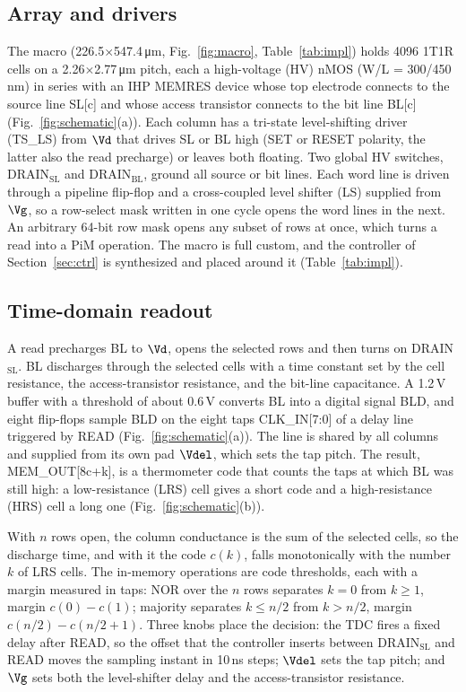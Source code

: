 \subsection{Array and drivers}
The macro (226.5$\times$547.4\,\si{\micro\meter}, Fig.~\ref{fig:macro}, Table~\ref{tab:impl}) holds 4096 1T1R cells on a 2.26$\times$2.77\,\si{\micro\meter} pitch, each a high-voltage (HV)
nMOS (W/L = 300/450\,nm) in series with an IHP MEMRES device whose top electrode connects to the
source line SL[c] and whose access transistor connects to the bit line BL[c]
(Fig.~\ref{fig:schematic}(a)). Each column has a tri-state level-shifting driver (TS\_LS) from $\Vd$ that drives SL or BL high
(SET or RESET polarity, the latter also the read precharge) or leaves both floating. Two global HV switches, DRAIN$_\mathrm{SL}$ and
DRAIN$_\mathrm{BL}$, ground all source or bit lines. Each word line is driven through a
pipeline flip-flop and a cross-coupled level shifter (LS) supplied from $\Vg$, so a row-select
mask written in one cycle opens the word lines in the next. An arbitrary 64-bit row mask opens any subset of rows at once, which turns a read into a
PiM operation. The macro is full custom, and the controller of Section~\ref{sec:ctrl} is
synthesized and placed around it (Table~\ref{tab:impl}).


\subsection{Time-domain readout}
A read precharges BL to $\Vd$, opens the selected rows and then turns on DRAIN$_\mathrm{SL}$.
BL discharges through the selected cells with a time constant set by the cell resistance, the
access-transistor resistance, and the bit-line capacitance. A 1.2\,V buffer with a threshold of
about 0.6\,V converts BL into a digital signal BLD, and eight flip-flops sample BLD on the eight
taps CLK\_IN[7:0] of a delay line triggered by READ (Fig.~\ref{fig:schematic}(a)). The line is
shared by all columns and supplied from its own pad $\Vdel$, which sets the tap pitch. The
result, MEM\_OUT[8c+k], is a thermometer code that counts the taps at which BL was still high: a
low-resistance (LRS) cell gives a short code and a high-resistance (HRS) cell a long one
(Fig.~\ref{fig:schematic}(b)).

With $n$ rows open, the column conductance is the sum of the selected cells, so the discharge
time, and with it the code $c(k)$, falls monotonically with the number $k$ of LRS cells. The
in-memory operations are code thresholds, each with a margin measured in taps: NOR over
the $n$ rows separates $k=0$ from $k\ge1$, margin $c(0)-c(1)$; majority separates $k\le n/2$
from $k>n/2$, margin $c(n/2)-c(n/2+1)$. Three knobs place
the decision: the TDC fires a fixed delay after
READ, so the offset that the controller inserts between DRAIN$_\mathrm{SL}$ and READ moves the sampling instant
in 10\,ns steps; $\Vdel$ sets the tap pitch; and $\Vg$ sets both the level-shifter delay and the
access-transistor resistance.

